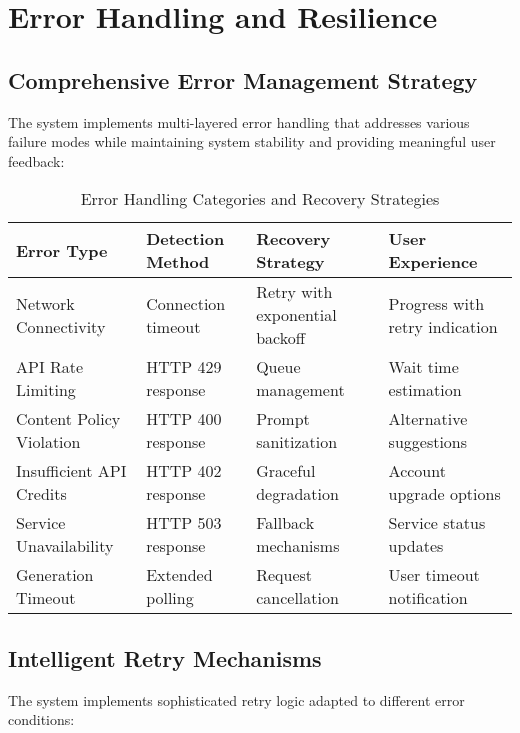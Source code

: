 \section{Error Handling and Resilience}

\subsection{Comprehensive Error Management Strategy}

The system implements multi-layered error handling that addresses various failure modes while maintaining system stability and providing meaningful user feedback:

\begin{table}[H]
\centering
\caption{Error Handling Categories and Recovery Strategies}
\label{tab:error_handling}
{\begin{tabular}{llll}
\toprule
\textbf{Error Type} & \textbf{Detection Method} & \textbf{Recovery Strategy} & \textbf{User Experience} \\
\midrule
Network Connectivity & Connection timeout & Retry with exponential backoff & Progress with retry indication \\
API Rate Limiting & HTTP 429 response & Queue management & Wait time estimation \\
Content Policy Violation & HTTP 400 response & Prompt sanitization & Alternative suggestions \\
Insufficient API Credits & HTTP 402 response & Graceful degradation & Account upgrade options \\
Service Unavailability & HTTP 503 response & Fallback mechanisms & Service status updates \\
Generation Timeout & Extended polling & Request cancellation & User timeout notification \\
\bottomrule
\end{tabular}}
\end{table}

\subsection{Intelligent Retry Mechanisms}

The system implements sophisticated retry logic adapted to different error conditions:

